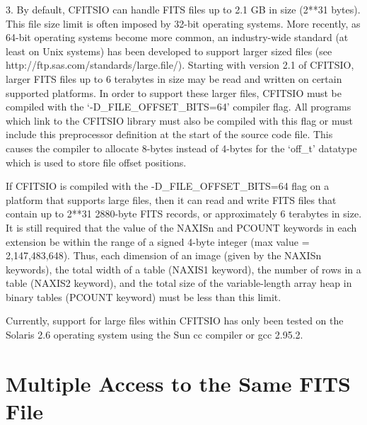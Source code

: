 \documentclass[11pt]{book}
\begin{document}
3.  By default, CFITSIO can handle FITS files up to 2.1 GB in size
(2**31 bytes).  This file size limit is often imposed by 32-bit
operating systems.  More recently, as 64-bit operating systems become
more common, an industry-wide standard (at least on Unix systems) has
been developed to support larger sized files (see
http://ftp.sas.com/standards/large.file/).  Starting with version 2.1
of CFITSIO, larger FITS files up to 6 terabytes in size may be read and
written on certain supported platforms.  In order to support these
larger files, CFITSIO must be compiled with the
`-D\_FILE\_OFFSET\_BITS=64' compiler flag.  All programs which link to
the CFITSIO library must also be compiled with this flag or must
include this preprocessor definition at the start of the source code
file.  This causes the compiler to allocate 8-bytes instead of 4-bytes
for the `off\_t' datatype which is used to store file offset
positions.

If CFITSIO is compiled with the -D\_FILE\_OFFSET\_BITS=64 flag on a
platform that supports large files, then it can read and write FITS
files that contain up to 2**31 2880-byte FITS records, or approximately
6 terabytes in size.  It is still required that the value of the NAXISn
and PCOUNT keywords in each extension be within the range of a signed
4-byte integer (max value = 2,147,483,648).  Thus, each dimension of an
image (given by the NAXISn keywords), the total width of a table
(NAXIS1 keyword), the number of rows in a table (NAXIS2 keyword), and
the total size of the variable-length array heap in binary tables
(PCOUNT keyword) must be less than this limit.

Currently, support for large files within CFITSIO has only been tested
on the Solaris 2.6 operating system using the Sun cc compiler or gcc
2.95.2.


\section{Multiple Access to the Same FITS File}
\end{document}
